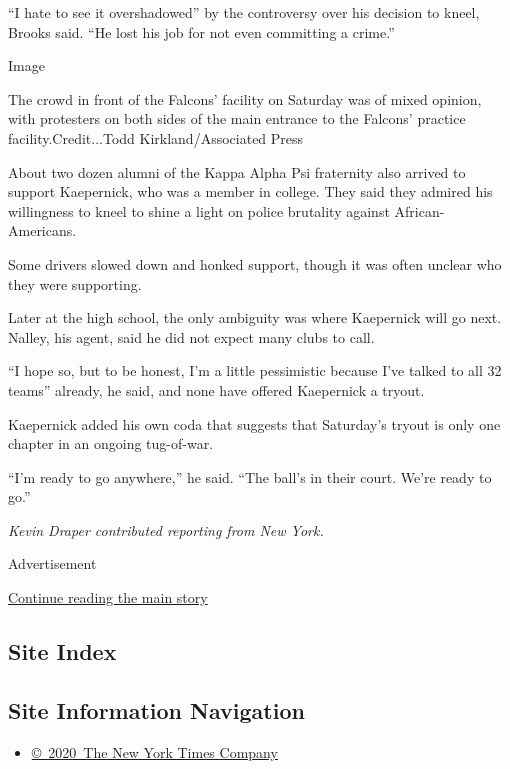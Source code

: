 ``I hate to see it overshadowed'' by the controversy over his decision
to kneel, Brooks said. ``He lost his job for not even committing a
crime.''

Image

The crowd in front of the Falcons' facility on Saturday was of mixed
opinion, with protesters on both sides of the main entrance to the
Falcons' practice facility.Credit...Todd Kirkland/Associated Press

About two dozen alumni of the Kappa Alpha Psi fraternity also arrived to
support Kaepernick, who was a member in college. They said they admired
his willingness to kneel to shine a light on police brutality against
African-Americans.

Some drivers slowed down and honked support, though it was often unclear
who they were supporting.

Later at the high school, the only ambiguity was where Kaepernick will
go next. Nalley, his agent, said he did not expect many clubs to call.

``I hope so, but to be honest, I'm a little pessimistic because I've
talked to all 32 teams'' already, he said, and none have offered
Kaepernick a tryout.

Kaepernick added his own coda that suggests that Saturday's tryout is
only one chapter in an ongoing tug-of-war.

``I'm ready to go anywhere,'' he said. ``The ball's in their court.
We're ready to go.''

\emph{Kevin Draper contributed reporting from New York.}

Advertisement

\protect\hyperlink{after-bottom}{Continue reading the main story}

\hypertarget{site-index}{%
\subsection{Site Index}\label{site-index}}

\hypertarget{site-information-navigation}{%
\subsection{Site Information
Navigation}\label{site-information-navigation}}

\begin{itemize}
\tightlist
\item
  \href{https://help.nytimes3xbfgragh.onion/hc/en-us/articles/115014792127-Copyright-notice}{©~2020~The
  New York Times Company}
\end{itemize}

